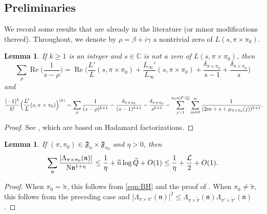 \documentclass[11pt]{amsart}
\newtheorem{lemma}[theorem]{Lemma}
\theoremstyle{remark}
\numberwithin{equation}{section}
\newcommand{\kn}{\mathfrak{n}}
\newcommand{\N}{\textnormal{N}}
\newcommand{\Q}{\mathbb{Q}}
\renewcommand{\tilde}{\widetilde}
\newcommand{\re}{\mathop{\mathrm{Re}}}
\begin{document}
\subsection{Preliminaries}

We record some results that are already in the literature (or minor modifications thereof).  Throughout, we denote by $\rho=\beta+i\gamma$ a nontrivial zero of $L(s,\pi\times\pi_0)$.

\begin{lemma}
\label{lem:log_deriv}
If $k\geq 1$ is an integer and $s\in\mathbb{C}$ is not a zero of $L(s,\pi\times\pi_0)$, then
\begin{equation}
\label{eqn:Hadamard_0}
\sum_{\rho}\re\Big(\frac{1}{s-\rho}\Big)=\re\Big(\frac{L'}{L}(s,\pi\times\pi_0)+\frac{L_{\infty}'}{L_{\infty}}(s,\pi\times\pi_0)+\frac{\delta_{\pi\times\pi_0}}{s-1}+\frac{\delta_{\pi\times\pi_0}}{s}\Big)
\end{equation}
and
{\small\begin{equation}
\label{eqn:Hadamard_k}
\frac{(-1)^k}{k!}\Big(\frac{L'}{L}(s,\pi\times\pi_0)\Big)^{(k)}=\sum_{\rho}\frac{1}{(s-\rho)^{k+1}}-\frac{\delta_{\pi\times\pi_0}}{(s-1)^{k+1}}-\frac{\delta_{\pi\times\pi_0}}{s^{k+1}}-\sum_{j=1}^{n_0 n [F:\Q]}\sum_{m=0}^{\infty}\frac{1}{(2m+s+\mu_{\pi\times\pi_0}(j))^{k+1}}.\hspace{-1mm}
\end{equation}
}%
\end{lemma}
\begin{proof}
See \cite[(3.3) and Section 4]{soundararajan2019weak}, which are based on Hadamard factorizations.
\end{proof}

\begin{lemma}
\label{lem:Mertens}
If $(\pi,\pi_0)\in\mathfrak{F}_n\times\mathfrak{F}_{n_0}$ and $\eta>0$, then
\[
\sum_{\kn}\frac{|\Lambda_{\pi\times\pi_0}(\kn)|}{\N\kn^{1+\eta}}\leq \frac{1}{\eta}+\tilde{n}\log \tilde{Q}+O(1)\leq \frac{1}{\eta}+\frac{\mathcal{L}}{2}+O(1).
\]
\end{lemma}
\begin{proof}
When $\pi_0=\tilde{\pi}$, this follows from \eqref{eqn:BH} and the proof of \cite[Lemma~2.3]{soundararajan2019weak}.  When $\pi_0\neq\tilde{\pi}$, this follows from the preceding case and $|\Lambda_{\pi\times\pi'}(\kn)|^2\leq \Lambda_{\pi\times\tilde{\pi}}(\kn)\Lambda_{\pi'\times\tilde{\pi}'}(\kn)$ \cite[Proposition A.1]{soundararajan2019weak}.
\end{proof}
\end{document}

